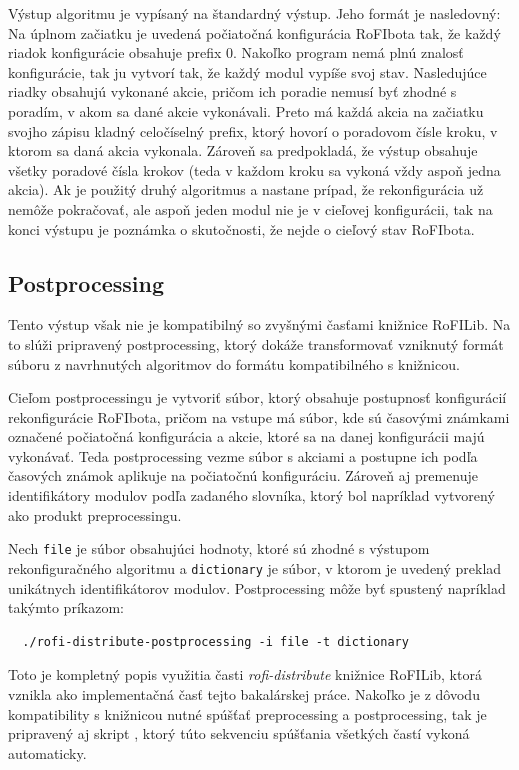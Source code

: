 \documentclass[
  printed, %
  oneside, %
  notable,   %
  nolof,     %
  nolot,     %
]{fithesis3}
\begin{document}
Výstup algoritmu je vypísaný na štandardný výstup. Jeho formát je nasledovný: Na úplnom začiatku je uvedená počiatočná konfigurácia RoFIbota tak, že každý riadok konfigurácie obsahuje prefix $0$. Nakoľko program nemá plnú znalosť konfigurácie, tak ju vytvorí tak, že každý modul vypíše svoj stav. Nasledujúce riadky obsahujú vykonané akcie, pričom ich poradie nemusí byť zhodné s poradím, v akom sa dané akcie vykonávali. Preto má každá akcia na začiatku svojho zápisu kladný celočíselný prefix, ktorý hovorí o poradovom čísle kroku, v ktorom sa daná akcia vykonala. Zároveň sa predpokladá, že výstup obsahuje všetky poradové čísla krokov (teda v každom kroku sa vykoná vždy aspoň jedna akcia). Ak je použitý druhý algoritmus a nastane prípad, že rekonfigurácia už nemôže pokračovať, ale aspoň jeden modul nie je v cieľovej konfigurácii, tak na konci výstupu je poznámka o skutočnosti, že nejde o cieľový stav RoFIbota. 

\subsection{Postprocessing}
Tento výstup však nie je kompatibilný so zvyšnými časťami knižnice RoFILib. Na to slúži pripravený postprocessing, ktorý dokáže transformovať vzniknutý formát súboru z navrhnutých algoritmov do formátu kompatibilného s knižnicou. 

Cieľom postprocessingu je vytvoriť súbor, ktorý obsahuje postupnosť konfigurácií rekonfigurácie RoFIbota, pričom na vstupe má súbor, kde sú časovými známkami označené počiatočná konfigurácia a akcie, ktoré sa na danej konfigurácii majú vykonávať. Teda postprocessing vezme súbor s akciami a postupne ich podľa časových známok aplikuje na počiatočnú konfiguráciu. Zároveň aj premenuje identifikátory modulov podľa zadaného slovníka, ktorý bol napríklad vytvorený ako produkt preprocessingu. 

Nech \texttt{file} je súbor obsahujúci hodnoty, ktoré sú zhodné s výstupom rekonfiguračného algoritmu a \texttt{dictionary} je súbor, v ktorom je uvedený preklad unikátnych identifikátorov modulov. Postprocessing môže byť spustený napríklad takýmto príkazom: 
\begin{verbatim}
  ./rofi-distribute-postprocessing -i file -t dictionary
\end{verbatim}

Toto je kompletný popis využitia časti \textit{rofi-distribute} knižnice RoFILib, ktorá vznikla ako implementačná časť tejto bakalárskej práce. Nakoľko je z dôvodu kompatibility s knižnicou nutné spúšťať preprocessing a postprocessing, tak je pripravený aj skript , ktorý túto sekvenciu spúšťania všetkých častí vykoná automaticky. 
\end{document}
